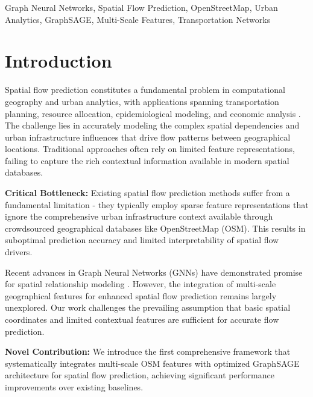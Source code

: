 \documentclass[twocolumn,11pt]{IEEEtran}  %
\begin{document}
\begin{IEEEkeywords}
Graph Neural Networks, Spatial Flow Prediction, OpenStreetMap, Urban Analytics, GraphSAGE, Multi-Scale Features, Transportation Networks
\end{IEEEkeywords}

\section{Introduction}

Spatial flow prediction constitutes a fundamental problem in computational geography and urban analytics, with applications spanning transportation planning, resource allocation, epidemiological modeling, and economic analysis \cite{flowref1}. The challenge lies in accurately modeling the complex spatial dependencies and urban infrastructure influences that drive flow patterns between geographical locations. Traditional approaches often rely on limited feature representations, failing to capture the rich contextual information available in modern spatial databases.

\textbf{Critical Bottleneck:} Existing spatial flow prediction methods suffer from a fundamental limitation - they typically employ sparse feature representations that ignore the comprehensive urban infrastructure context available through crowdsourced geographical databases like OpenStreetMap (OSM). This results in suboptimal prediction accuracy and limited interpretability of spatial flow drivers.

Recent advances in Graph Neural Networks (GNNs) have demonstrated promise for spatial relationship modeling \cite{gnnref1}. However, the integration of multi-scale geographical features for enhanced spatial flow prediction remains largely unexplored. Our work challenges the prevailing assumption that basic spatial coordinates and limited contextual features are sufficient for accurate flow prediction.

\textbf{Novel Contribution:} We introduce the first comprehensive framework that systematically integrates multi-scale OSM features with optimized GraphSAGE architecture for spatial flow prediction, achieving significant performance improvements over existing baselines.
\end{document}
